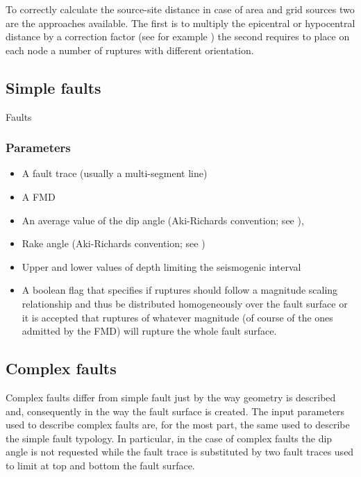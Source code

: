 To correctly calculate the source-site distance in case of area and grid sources 
two are the approaches available. The first is to multiply the epicentral or 
hypocentral distance by a correction factor (see for example \cite{harmsen08})
the second requires to place on each node a number of ruptures with different 
orientation. 



\subsection{Simple faults}
Faults 
%
\subsubsection{Parameters}
\begin{itemize}
\item A fault trace (usually a multi-segment line) 
\item A FMD 
\item An average value of the dip angle  (Aki-Richards convention; see 
	\citet{aki2002}),
\item Rake angle (Aki-Richards convention; see \citet{aki2002}) 
\item Upper and lower values of depth limiting the seismogenic interval 
\item A boolean flag that specifies if ruptures should follow a magnitude scaling 
relationship and thus be distributed homogeneously over the fault surface or it is 
accepted that ruptures of whatever magnitude (of course of the ones admitted by 
the FMD) will rupture the whole fault surface.
\end{itemize}
\subsection{Complex faults}
Complex faults differ from simple fault just by the way geometry is described and, 
consequently in the way the fault surface is created. The input parameters used to 
describe complex faults are, for the most part, the same used to describe the 
simple fault typology. In particular, in the case of complex faults the dip angle
is not requested while the fault trace is substituted by two fault traces used to 
limit at top and bottom the fault surface. 
